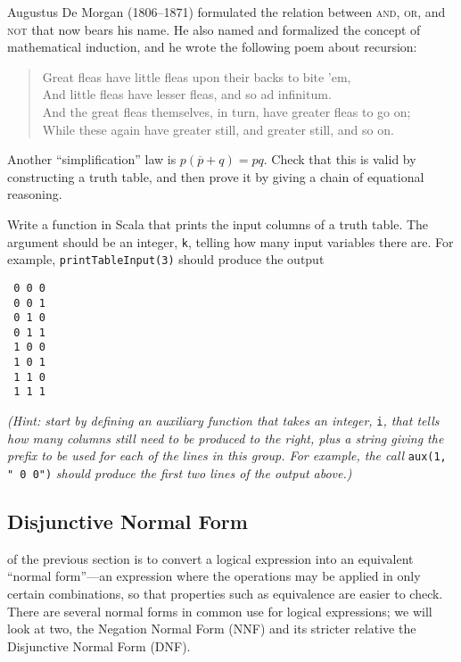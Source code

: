 \begin{tailquote}
Augustus De Morgan (1806--1871) formulated the relation between \textsc{and}, \textsc{or}, and \textsc{not} that now bears his name. He also named and formalized the concept of mathematical induction, and he wrote the following poem about recursion:
\begin{verse}
Great fleas have little fleas upon their backs to bite 'em,\\
And little fleas have lesser fleas, and so ad infinitum.\\
And the great fleas themselves, in turn, have greater fleas to go on;\\
While these again have greater still, and greater still, and so on.
\end{verse}
\end{tailquote}

\begin{exercises}
\item Another ``simplification'' law is $p(\overline{p}+q) = pq$. Check that this is valid by constructing a truth table, and then prove it by giving a chain of equational reasoning.
\item Write a function in Scala that prints the input columns of a truth table. The argument should be an integer, \verb|k|, telling how many input variables there are. For example, \verb|printTableInput(3)| should produce the output
\begin{verbatim}
 0 0 0
 0 0 1
 0 1 0
 0 1 1
 1 0 0
 1 0 1
 1 1 0
 1 1 1
\end{verbatim}
\textit{(Hint: start by defining an auxiliary function that takes an integer,} \verb|i|\textit{, that tells how many columns still need to be produced to the right, plus a string giving the prefix to be used for each of the lines in this group. For example, the call} \verb|aux(1, " 0 0")| \textit{should produce the first two lines of the output above.)}
\end{exercises}

\subsection{Disjunctive Normal Form}\label{ssec:DNF}
 of the previous section is to convert a logical expression into an equivalent ``normal form''---an expression where the operations may be applied in only certain combinations, so that properties such as equivalence are easier to check. There are several normal forms in common use for logical expressions; we will look at two, the Negation Normal Form (NNF) and its stricter relative the Disjunctive Normal Form (DNF).

